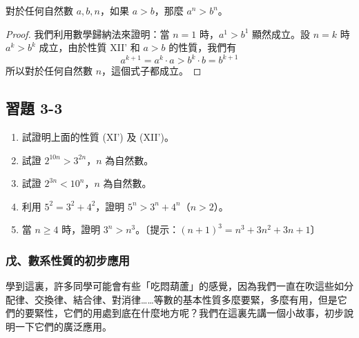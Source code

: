 \begin{example}\label{ex:power_order}
對於任何自然數 $a, b, n$，如果 $a > b$，那麼 $a^n > b^n$。
\end{example}

\begin{proof}
我們利用數學歸納法來證明：當 $n=1$ 時，$a^1 > b^1$ 顯然成立。設 $n=k$ 時 $a^k > b^k$ 成立，由於性質 XII' 和 $a > b$ 的性質，我們有
\begin{equation*}
  a^{k+1} = a^k \cdot a > b^k \cdot b = b^{k+1}
\end{equation*}
所以對於任何自然數 $n$，這個式子都成立。
\end{proof}

\subsection*{習題 3-3}\label{sec:ex3-3}

\begin{enumerate}[1., leftmargin=2em]
  \item 試證明上面的性質 (XI') 及 (XII')。
  \item 試證 $2^{10n} > 3^{2n}$，$n$ 為自然數。
  \item 試證 $2^{3n} < 10^n$，$n$ 為自然數。
  \item 利用 $5^2 = 3^2 + 4^2$，證明 $5^n > 3^n + 4^n$（$n > 2$）。
  \item 當 $n \ge 4$ 時，證明 $3^n > n^3$。〔提示：$(n+1)^3 = n^3 + 3n^2 + 3n + 1$〕
\end{enumerate}

\subsubsection*{戊、數系性質的初步應用}\label{subsec:nat_app}

學到這裏，許多同學可能會有些「吃悶葫蘆」的感覺，因為我們一直在吹這些如分配律、交換律、結合律、對消律……等數的基本性質多麼要緊，多麼有用，但是它們的要緊性，它們的用處到底在什麼地方呢？我們在這裏先講一個小故事，初步說明一下它們的廣泛應用。

